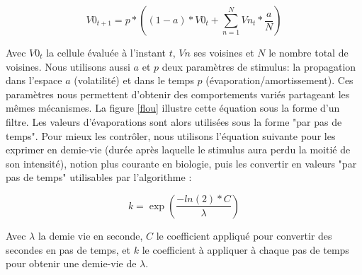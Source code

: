 			\begin{equation}
			V0_{t+1} = p * ((1-a) * V0_t + \sum_{n=1}^{N} Vn_t * \frac{a}{N})
			\end{equation}
			
			Avec $V0_t$ la cellule évaluée à l'instant $t$, $Vn$ ses voisines et $N$ le nombre total de voisines. Nous utilisons aussi $a$ et $p$ deux paramètres de stimulus: la propagation dans l'espace $a$ (volatilité) et dans le temps $p$ (évaporation/amortissement). Ces paramètres nous permettent d'obtenir des comportements variés partageant les mêmes mécanismes. La figure \ref{flou} illustre cette équation sous la forme d'un filtre. Les valeurs d'évaporations sont alors utilisées sous la forme "par pas de temps". Pour mieux les contrôler, nous utilisons l'équation suivante pour les exprimer en demie-vie (durée après laquelle le stimulus aura perdu la moitié de son intensité), notion plus courante en biologie, puis les convertir en valeurs "par pas de temps" utilisables par l'algorithme :
			
			\begin{equation}
			k = \exp(\frac{-ln(2) * C}{\lambda})
			\end{equation}
			
			Avec $\lambda$ la demie vie en seconde, $C$ le coefficient appliqué pour convertir des secondes en pas de temps, et $k$ le coefficient à appliquer à chaque pas de temps pour obtenir une demie-vie de $\lambda$.
			
